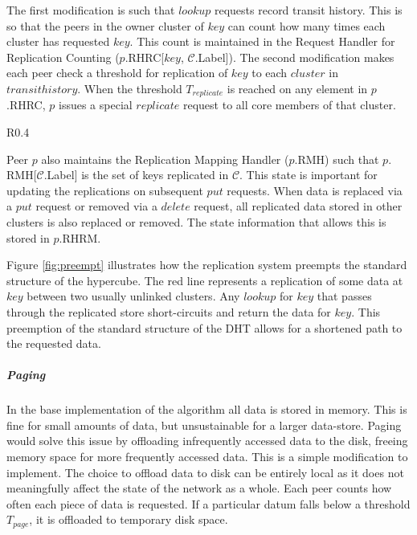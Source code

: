 \documentclass[12pt]{report}
\theoremstyle{plain}
\begin{document}
			The first modification is such that $lookup$ requests record transit history. 
			This is so that the peers in the owner cluster of $key$ can count how many times each cluster has requested $key$. 
			This count is maintained in the Request Handler for Replication Counting ($p$.RHRC[$key$, $\mathcal{C}$.Label]). 
			The second modification makes each peer check a threshold for replication of $key$ to each $cluster$ in $transithistory$. 
			When the threshold $T_{replicate}$ is reached on any element in $p$.RHRC, $p$ issues a special $replicate$ request to all core 
			members of that cluster.

			\begin{wrapfigure}{R}{0.4\columnwidth}
				\hspace*{-0.08\linewidth}
				\centering
				
				\caption{Replication routing}
				\label{fig:preempt}
			\end{wrapfigure}			
			
			Peer $p$ also maintains the Replication Mapping Handler ($p$.RMH) such that 
			$p.$RMH[$\mathcal{C}$.Label] is the set of keys 
			replicated in $\mathcal{C}$.
			This state is important for updating the replications on subsequent $put$ requests.
			When data is replaced via a $put$ request or removed via a $delete$ request, all replicated data stored in other clusters is also replaced or removed.
			The state information that allows this is stored in $p$.RHRM.
			
			Figure \ref{fig:preempt} illustrates how the replication system preempts the standard structure of the hypercube. 
			The red line represents a replication of some data at $key$ between two usually unlinked clusters. 
			Any $lookup$ for $key$ that passes through the replicated store short-circuits and return the data for $key$.
			This preemption of the standard structure of the DHT allows for a shortened path to the requested data.
			

		\subparagraph*{Paging}
		
		In the base implementation of the algorithm all data is stored in memory. 
		This is fine for small amounts of data, but unsustainable for a larger data-store.
		Paging would solve this issue by offloading infrequently accessed data to the disk, freeing memory space for more frequently accessed data.
		This is a simple modification to implement. 
		The choice to offload data to disk can be entirely local as it does not meaningfully affect the state of the network as a whole.
		Each peer counts how often each piece of data is requested. 
		If a particular datum falls below a threshold $T_{page}$, it is offloaded to temporary disk space.
		
\end{document}
